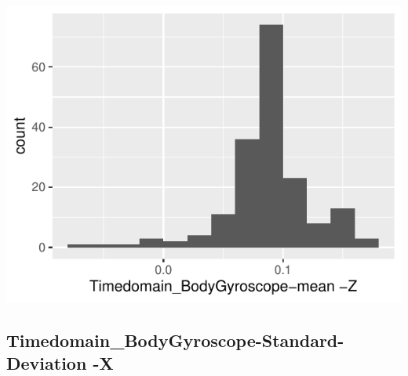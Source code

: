 \documentclass[
]{article}
\begin{document}
\begin{minipage}{0.25 \textwidth}

\includegraphics{codebook_tidydatasub_files/figure-latex/Var-23-Timedomain-BodyGyroscope-mean--Z-1.pdf}

\end{minipage}

\noindent\makebox[\linewidth]{\rule{\textwidth}{0.4pt}}

\hypertarget{timedomain_bodygyroscope-standard-deviation--x}{%
\subsection{Timedomain\_BodyGyroscope-Standard-Deviation
-X}\label{timedomain_bodygyroscope-standard-deviation--x}}
\end{document}
